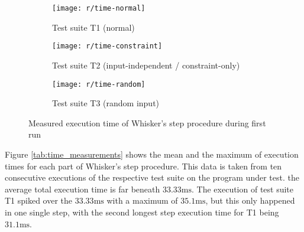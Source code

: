 \begin{figure}[htpb]
    \centering

    \begin{subfigure}{\textwidth}
        \centering
        \texttt{[image: r/time-normal]}
        \vspace{-\medskipamount}
        \caption{Test suite T1 (normal)}
    \end{subfigure}

    \begin{subfigure}{\textwidth}
        \centering
        \texttt{[image: r/time-constraint]}
        \vspace{-\medskipamount}
        \caption{Test suite T2 (input-independent / constraint-only)}
    \end{subfigure}

    \begin{subfigure}{\textwidth}
        \centering
        \texttt{[image: r/time-random]}
        \vspace{-\medskipamount}
        \caption{Test suite T3 (random input)}
    \end{subfigure}

    \caption{Measured execution time of Whisker's step procedure during first run}
    \label{fig:time_line_plot}
\end{figure}

Figure \ref{tab:time_measurements} shows the mean and the maximum of execution times for each part of Whisker's step procedure.
This data is taken from ten consecutive executions of the respective test suite on the program under test.
the average total execution time is far beneath $33.33\text{ms}$.
The execution of test suite T1 spiked over the $33.33\text{ms}$ with a maximum of $35.1\text{ms}$,
but this only happened in one single step, with the second longest step execution time for T1 being $31.1\text{ms}$.

%


